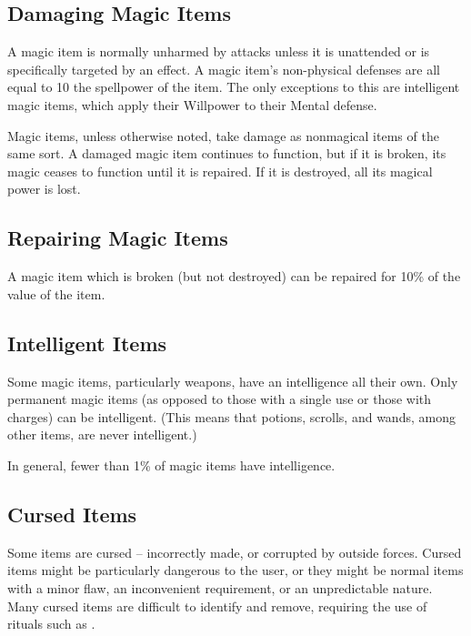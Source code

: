     \subsection{Damaging Magic Items}

        A magic item is normally unharmed by attacks unless it is unattended or is specifically targeted by an effect.
        A magic item's non-physical defenses are all equal to 10 \add the spellpower of the item.
        The only exceptions to this are intelligent magic items, which apply their Willpower to their Mental defense.

        Magic items, unless otherwise noted, take damage as nonmagical items of the same sort.
        A damaged magic item continues to function, but if it is broken, its magic ceases to function until it is repaired.
        If it is destroyed, all its magical power is lost.

    \subsection{Repairing Magic Items}

        A magic item which is broken (but not destroyed) can be repaired for 10\% of the value of the item.

    \subsection{Intelligent Items}

        Some magic items, particularly weapons, have an intelligence all their own.
        Only permanent magic items (as opposed to those with a single use or those with charges) can be intelligent.
        (This means that potions, scrolls, and wands, among other items, are never intelligent.)

        In general, fewer than 1\% of magic items have intelligence.

    \subsection{Cursed Items}

        Some items are cursed -- incorrectly made, or corrupted by outside forces.
        Cursed items might be particularly dangerous to the user, or they might be normal items with a minor flaw, an inconvenient requirement, or an unpredictable nature.
        Many cursed items are difficult to identify and remove, requiring the use of rituals such as .
